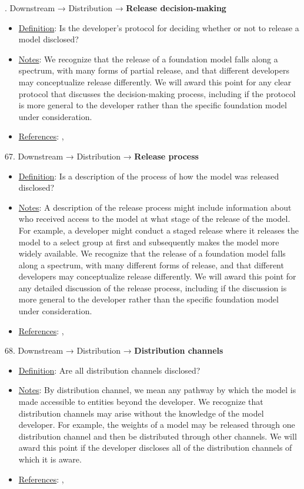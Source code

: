 . Downstream → Distribution → \textbf{Release decision-making}
\vspace{-\parskip}
\begin{itemize}
\item
\underline{Definition}: Is the developer’s protocol for deciding whether or not to release a model disclosed?
\item
\underline{Notes}: We recognize that the release of a foundation model falls along a spectrum, with many forms of partial release, and that different developers may conceptualize release differently. We will award this point for any clear protocol that discusses the decision-making process, including if the protocol is more general to the developer rather than the specific foundation model under consideration.
\item
\underline{References}: \citet{solaiman2023gradient}, \citet{liang2022community-norms}
\end{itemize}


67. Downstream → Distribution → \textbf{Release process}
\vspace{-\parskip}
\begin{itemize}
\item
\underline{Definition}: Is a description of the process of how the model was released disclosed?
\item
\underline{Notes}: A description of the release process might include information about who received access to the model at what stage of the release of the model. For example, a developer might conduct a staged release where it releases the model to a select group at first and subsequently makes the model more widely available. We recognize that the release of a foundation model falls along a spectrum, with many different forms of release, and that different developers may conceptualize release differently. We will award this point for any detailed discussion of the release process, including if the discussion is more general to the developer rather than the specific foundation model under consideration.
\item
\underline{References}: \citet{solaiman2023gradient}, \citet{liang2022community-norms}
\end{itemize}


68. Downstream → Distribution → \textbf{Distribution channels}
\vspace{-\parskip}
\begin{itemize}
\item
\underline{Definition}: Are all distribution channels disclosed?
\item
\underline{Notes}: By distribution channel, we mean any pathway by which the model is made accessible to entities beyond the developer. We recognize that distribution channels may arise without the knowledge of the model developer. For example, the weights of a model may be released through one distribution channel and then be distributed through other channels. We will award this point if the developer discloses all of the distribution channels of which it is aware.
\item
\underline{References}: \citet{cobbe2023supply}, \citet{widder2023thinking}
\end{itemize}


